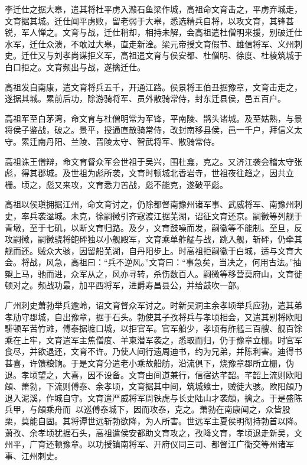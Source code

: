 \documentclass[]{article}
\begin{document}
李迁仕之据大皋，遣其将杜平虏入灨石鱼梁作城，高祖命文育击之，平虏弃城走，文育据其城。迁仕闻平虏败，留老弱于大皋，悉选精兵自将，以攻文育，其锋甚锐，军人惮之。文育与战，迁仕稍却，相持未解，会高祖遣杜僧明来援，别破迁仕水军，迁仕众溃，不敢过大皋，直走新淦。梁元帝授文育假节、雄信将军、义州刺史。迁仕又与刘孝尚谋拒义军，高祖遣文育与侯安都、杜僧明、徐度、杜棱筑城于白口拒之。文育频出与战，遂擒迁仕。

高祖发自南康，遣文育将兵五千，开通江路。侯景将王伯丑据豫章，文育击走之，遂据其城。累前后功，除游骑将军、员外散骑常侍，封东迁县侯，邑五百户。

高祖军至白茅湾，命文育与杜僧明常为军锋，平南陵、鹊头诸城。及至姑熟，与景将侯子鉴战，破之。景平，授通直散骑常侍，改封南移县侯，邑一千户，拜信义太守。累迁南丹阳、兰陵、晋陵太守、智武将军、散骑常侍。

高祖诛王僧辩，命文育督众军会世祖于吴兴，围杜龛，克之。又济江袭会稽太守张彪，得其郡城。及世祖为彪所袭，文育时顿城北香岩寺，世祖夜往趋之，因共立栅。顷之，彪又来攻，文育悉力苦战，彪不能克，遂破平彪。

高祖以侯瑱拥据江州，命文育讨之，仍除都督南豫州诸军事、武威将军、南豫州刺史，率兵袭湓城。未克，徐嗣徽引齐寇渡江据芜湖，诏征文育还京。嗣徽等列舰于青墩，至于七矶，以断文育归路。及夕，文育鼓噪而发，嗣徽等不能制。至旦，反攻嗣徽，嗣徽骁将鲍砰独以小舰殿军，文育乘单舴艋与战，跳入舰，斩砰，仍牵其舰而还。贼众大骇，因留船芜湖，自丹阳步上。时高祖拒嗣徽于白城，适与文育大会。将战，风急，高祖曰：``兵不逆风。''文育曰：``事急矣，当决之，何用古法。''抽槊上马，驰而进，众军从之，风亦寻转，杀伤数百人。嗣微等移营莫府山，文育徙顿对之。频战功最，加平西将军，进爵寿昌县公，并给鼓吹一部。

广州刺史萧勃举兵逾岭，诏文育督众军讨之。时新吴洞主余孝顷举兵应勃，遣其弟孝劢守郡城，自出豫章，据于石头。勃使其子孜将兵与孝顷相会，又遣其别将欧阳騑顿军苦竹滩，傅泰据墌口城，以拒官军。官军船少，孝顷有舴艋三百艘、舰百馀乘在上牢，文育遣军主焦僧度、羊柬潜军袭之，悉取而归，仍于豫章立栅。时官军食尽，并欲退还，文育不许。乃使人间行遗周迪书，约为兄弟，并陈利害。迪得书甚喜，许馈粮饷。于是文育分遣老小乘故船舫，沿流俱下，烧豫章郡所立栅，伪退。孝顷望之，大喜，因不设备。文育由间道兼行，信宿达芊韶。芊韶上流则欧阳頠、萧勃，下流则傅泰、余孝顷，文育据其中间，筑城飨士，贼徒大骇。欧阳頠乃退入泥溪，作城自守。文育遣严威将军周铁虎与长史陆山才袭頠，擒之。于是盛陈兵甲，与頠乘舟而，以巡傅泰城下，因而攻泰，克之。萧勃在南康闻之，众皆股栗，莫能自固。其将谭世远斩勃欲降，为人所害。世远军主夏侯明彻持勃首以降。萧孜、余孝顷犹据石头，高祖遣侯安都助文育攻之，孜降文育，孝顷退走新吴，文州平，广育还顿豫章。以功授镇南将军、开府仪同三司、都督江广衡交等州诸军事、江州刺史。
\end{document}
